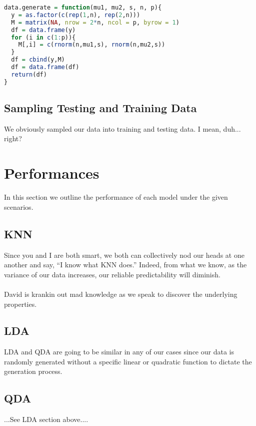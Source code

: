 \documentclass[11pt, oneside]{article}
\begin{document}
\begin{mdframed}[backgroundcolor=lightgray]
\begin{lstlisting}[language=R]
data.generate = function(mu1, mu2, s, n, p){
  y = as.factor(c(rep(1,n), rep(2,n)))
  M = matrix(NA, nrow = 2*n, ncol = p, byrow = 1)
  df = data.frame(y)
  for (i in c(1:p)){
    M[,i] = c(rnorm(n,mu1,s), rnorm(n,mu2,s))
  }
  df = cbind(y,M)
  df = data.frame(df)
  return(df)
}
\end{lstlisting}
\end{mdframed}



\subsection*{Sampling Testing and Training Data}
We obviously sampled our data into training and testing data. I mean, duh... right?


\section*{Performances}
In this section we outline the performance of each model under the given scenarios.\\

\subsection*{KNN}
Since you and I are both smart, we both can collectively nod our heads at one another and say, ``I know what KNN does.'' Indeed, from what we know, as the variance of our data increases, our reliable predictability will diminish.\\
\\
David is krankin out mad knowledge as we speak to discover the underlying properties.




\subsection*{LDA}
LDA and QDA are going to be similar in any of our cases since our data is randomly generated without a specific linear or quadratic function to dictate the generation process.



\subsection*{QDA}
...See LDA section above....
\end{document}
